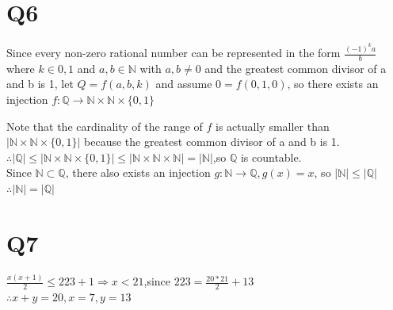 \documentclass[12pt]{article}
\begin{document}
\section{Q6}
Since every non-zero rational number can be represented in the form	$\frac{(-1)^ka}{b}$ where $k\in{0,1}$ and $a,b\in \mathbb{N}$ with $a,b\neq0$ and the greatest common divisor of a and b is 1, let $Q=f(a,b,k)$ and assume $0=f(0,1,0)$, so there exists an injection $f:\mathbb{Q}\rightarrow\mathbb{N}\times\mathbb{N}\times\{0,1\}$
\par Note that the cardinality of the range of $f$ is actually smaller than $|\mathbb{N}\times\mathbb{N}\times\{0,1\}|$ because the greatest common divisor of a and b
is 1.
\\$\therefore |\mathbb{Q|}\leq|\mathbb{N}\times\mathbb{N}\times\{0,1\}|\leq|\mathbb{N}\times\mathbb{N}\times\mathbb{N}|=|\mathbb{N}|$,so $\mathbb{Q}$ is countable.
\\Since $\mathbb{N}\subset\mathbb{Q}$, there also exists an injection $g: \mathbb{N}\rightarrow \mathbb{Q},g(x)=x$, so $|\mathbb{N}|\leq|\mathbb{Q}|$
\\$\therefore|\mathbb{N}|=|\mathbb{Q}|$
\section{Q7}
$\frac{x(x+1)}{2}\leq223+1\Rightarrow x<21$,since $223=\frac{20*21}{2}+13$
\\$\therefore x+y=20,x=7,y=13$
\end{document}
